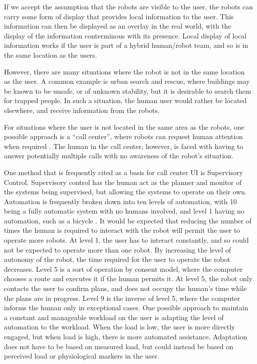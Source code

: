 \documentclass[]{article}
\begin{document}
If we accept the assumption that the robots are visible to the user, the robots can carry some form of display that provides local information to the user. 
This information can then be displayed as an overlay in the real world, with the display of the information conterminous with its presence\cite{Daily:2003:WEI:820752.821587}. 
Local display of local information works if the user is part of a hybrid human/robot team, and so is in the same location as the users. 

However, there are many situations where the robot is not in the same location as the user. 
A common example is urban search and rescue, where buildings may be known to be unsafe, or of unknown stability, but it is desirable to search them for trapped people. 
In such a situation, the human user would rather be located elsewhere, and receive information from the robots. 

For situations where the user is not located in the same area as the robots, one possible approach is a ``call center'', where robots can request human attention when required \cite{chen2011supervisory}. The human in the call center, however, is faced with having to answer potentially multiple calls with no awareness of the robot's situation. 

One method that is frequently cited as a basis for call center UI is Supervisory Control. 
Supervisory control has the human act as the planner and monitor of the systems being supervised, but allowing the systems to operate on their own.
Automation is frequently broken down into ten levels of automation, with 10 being a fully automatic system with no humans involved, and level 1 having no automation, such as a bicycle \cite{parasuraman2000model}. 
It would be expected that reducing the number of times the human is required to interact with the robot will permit the user to operate more robots.
At level 1, the user has to interact constantly, and so could not be expected to operate more than one robot. 
By increasing the level of autonomy of the robot, the time required for the user to operate the robot decreases.  
Level 5 is a sort of operation by consent model, where the computer chooses a route and executes it if the human permits it. 
At level 5, the robot only contacts the user to confirm plans, and does not occupy the human's time while the plans are in progress. 
Level 9 is the inverse of level 5, where the computer informs the human only in exceptional cases. 
One possible approach to maintain a constant and manageable workload on the user is adapting the level of automation to the workload. 
When the load is low, the user is more directly engaged, but when load is high, there is more automated assistance. 
Adaptation does not have to be based on measured load, but could instead be based on perceived load or physiological markers in the user. 
\end{document}
